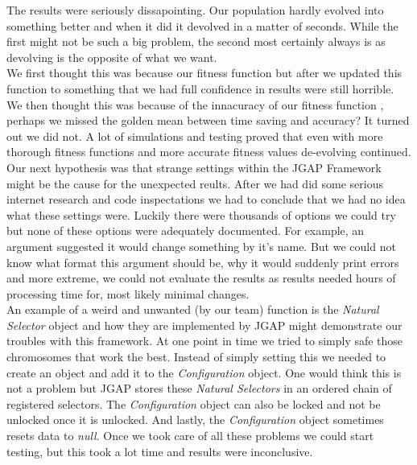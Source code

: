 \documentclass[a4paper,10pt]{article}
\begin{document}
The results were seriously dissapointing. Our population hardly evolved into something better and when it did it devolved in a matter of seconds. While the first might not
be such a big problem, the second most certainly always is as devolving is the opposite of what we want.\\

We first thought this was because our fitness function but after
we updated this function to something that we had full confidence in results were still horrible. \\

We then thought this was because of the innacuracy of our fitness function
, perhaps we missed the golden mean between time saving and accuracy? It turned out we did not. A lot of simulations and testing proved that even with more thorough 
fitness functions and more accurate fitness values de-evolving continued. \\

Our next hypothesis was that strange settings within the JGAP Framework might be the cause for the unexpected reults. After we had did some serious internet research 
and code inspectations we had to conclude that 
we had no idea what these settings were. Luckily there were thousands of options we could try but none of these options were adequately documented. For example, an 
argument suggested it would change something by it's name. But we could not know what format this argument should be, why it would suddenly print errors and more extreme, 
we could not evaluate the results as results needed hours of processing time for, most likely minimal changes. \\

An example of a weird and unwanted (by our team) function 
is the \textit{Natural Selector} object and how they are implemented by JGAP might demonstrate our troubles with this framework. At one point in time we tried to simply safe
 those chromosomes that work the best. Instead of simply setting this
we needed to create an object and add it to the \textit{Configuration} object. One would think this is not a problem but JGAP stores these \textit{Natural Selectors} 
in an ordered
chain of registered selectors. The \textit{Configuration} object can also be locked and not be unlocked once it is unlocked. And lastly, the \textit{Configuration} object
sometimes resets data to \textit{null}. Once we took care of all these problems we could start testing, but this took a lot time and results were inconclusive.\\
\end{document}
